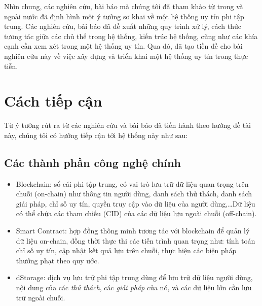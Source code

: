Nhìn chung, các nghiên cứu, bài báo mà chúng tôi đã tham khảo từ trong và ngoài nước đã định hình một ý tưởng sơ khai về một hệ thống uy tín phi tập trung. Các nghiên cứu, bài báo đã đề xuất những quy trình xử lý, cách thức tương tác giữa các chủ thể trong hệ thống, kiến trúc hệ thống, cũng như các khía cạnh cần xem xét trong một hệ thống uy tín. Qua đó, đã tạo tiền đề cho bài nghiên cứu này về việc xây dựng và triển khai một hệ thống uy tín trong thực tiễn.

\section{Cách tiếp cận}

Từ ý tưởng rút ra từ các nghiên cứu và bài báo đã tiến hành theo hướng đề tài này, chúng tôi có hướng tiếp cận tới hệ thống này như sau:

\subsection{Các thành phần công nghệ chính}
\begin{itemize}
  \item Blockchain: sổ cái phi tập trung, có vai trò lưu trữ dữ liệu quan trọng trên chuỗi (on-chain) như thông tin người dùng, danh sách thử thách, danh sách giải pháp, chỉ số uy tín, quyền truy cập vào dữ liệu của người dùng,\dots Dữ liệu có thể chứa các tham chiếu (CID) của các dữ liệu lưu ngoài chuỗi (off-chain).
  \item Smart Contract: hợp đồng thông minh tương tác với blockchain để quản lý dữ liệu on-chain, đồng thời thực thi các tiến trình quan trọng như: tính toán chỉ số uy tín, cập nhật kết quả lưu trên chuỗi, thực hiện các biện pháp thưởng phạt theo quy ước.
  \item dStorage: dịch vụ lưu trữ phi tập trung dùng để lưu trữ dữ liệu người dùng, nội dung của các \textit{thử thách}, các \textit{giải pháp} của nó, và các dữ liệu lớn cần lưu trữ ngoài chuỗi.
\end{itemize}

